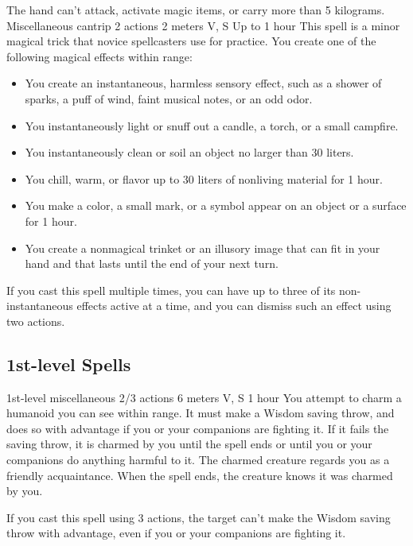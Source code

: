        The hand can't attack, activate magic items, or carry more than 5 kilograms.
        {Miscellaneous cantrip}
        {2 actions}
        {2 meters}
        {V, S}
        {Up to 1 hour}
        This spell is a minor magical trick that novice spellcasters use for practice.
        You create one of the following magical effects within range:
        \begin{itemize}
            \item You create an instantaneous, harmless sensory effect, such as a shower of sparks, a puff of wind, faint musical notes, or an odd odor.
            \item You instantaneously light or snuff out a candle, a torch, or a small campfire.
            \item You instantaneously clean or soil an object no larger than 30 liters.
            \item You chill, warm, or flavor up to 30 liters of nonliving material for 1 hour.
            \item You make a color, a small mark, or a symbol appear on an object or a surface for 1 hour.
            \item You create a nonmagical trinket or an illusory image that can fit in your hand and that lasts until the end of your next turn.
        \end{itemize}
        If you cast this spell multiple times, you can have up to three of its non-instantaneous effects active at a time, and you can dismiss such an effect using two actions.
\subsection*{1st-level Spells}
        {1st-level miscellaneous}
        {2/3 actions}
        {6 meters}
        {V, S}
        {1 hour}
        You attempt to charm a humanoid you can see within range.
        It must make a Wisdom saving throw, and does so with advantage if you or your companions are fighting it.
        If it fails the saving throw, it is charmed by you until the spell ends or until you or your companions do anything harmful to it.
        The charmed creature regards you as a friendly acquaintance.
        When the spell ends, the creature knows it was charmed by you.

        If you cast this spell using 3 actions, the target can't make the Wisdom saving throw with advantage, even if you or your companions are fighting it.

